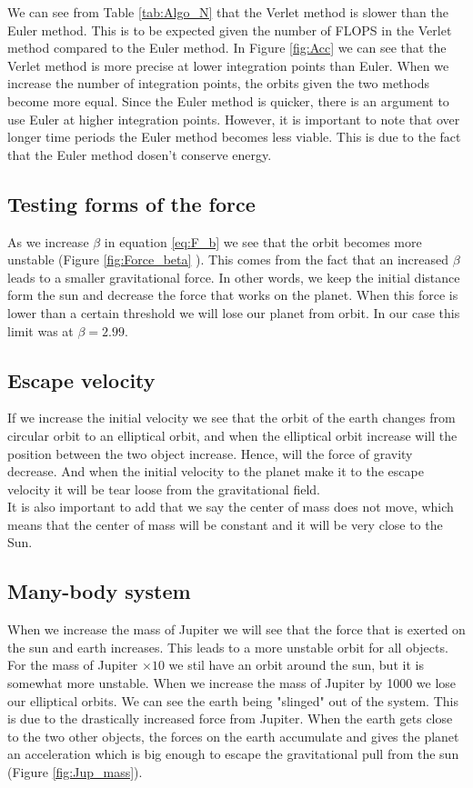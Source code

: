 \documentclass{article}
\begin{document}
\begin{multicols}{2}
We can see from Table \ref{tab:Algo_N} that the Verlet method is slower than the Euler method. This is to be expected given the number of FLOPS in the Verlet method compared to the Euler method. In Figure \ref{fig:Acc} we can see that the Verlet method is more precise at lower integration points than Euler. When we increase the number of integration points, the orbits given the two methods become more equal. Since the Euler method is quicker, there is an argument to use Euler at higher integration points. However, it is important to note that over longer time periods the Euler method becomes less viable. This is due to the fact that the Euler method dosen't conserve energy. 

\subsection{Testing forms of the force}

As we increase $\beta$ in equation \ref{eq:F_b} we see that the orbit becomes more unstable (Figure \ref{fig:Force_beta} ). This comes from the fact that an increased $\beta$ leads to a smaller gravitational force. In other words, we keep the initial distance form the sun and decrease the force that works on the planet. When this force is lower than a certain threshold we will lose our planet from orbit. In our case this limit was at $\beta=2.99$.  

\subsection{Escape velocity}
If we increase the initial velocity we see that the orbit of the earth changes from circular orbit to an elliptical orbit, and when the elliptical orbit increase will the position between the two object increase. Hence, will the force of gravity decrease. And when the initial velocity to the planet make it to the escape velocity it will be tear loose from the gravitational field.\\
It is also important to add that we say the center of mass does not move, which means that the center of mass will be constant and it will be very close to the Sun.  

\subsection{Many-body system}

When we increase the mass of Jupiter we will see that the force that is exerted on the sun and earth increases. This leads to a more unstable orbit for all objects. For the mass of Jupiter $\times 10$ we stil have an orbit around the sun, but it is somewhat more unstable. When we increase the mass of Jupiter by 1000 we lose our elliptical orbits. We can see the earth being "slinged" out of the system. This is due to the drastically increased force from Jupiter. When the earth gets close to the two other objects, the forces on the earth accumulate and gives the planet an acceleration which is big enough to escape the gravitational pull from the sun (Figure \ref{fig:Jup_mass}). 


\end{multicols}
\end{document}
